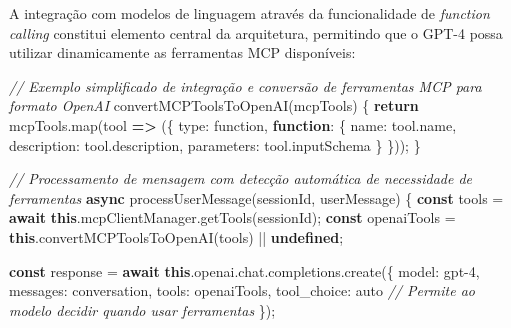 \documentclass[
]{article}
\newenvironment{Shaded}{}{}
\newcommand{\AttributeTok}[1]{\textcolor[rgb]{0.49,0.56,0.16}{#1}}
\newcommand{\CommentTok}[1]{\textcolor[rgb]{0.38,0.63,0.69}{\textit{#1}}}
\newcommand{\ControlFlowTok}[1]{\textcolor[rgb]{0.00,0.44,0.13}{\textbf{#1}}}
\newcommand{\DataTypeTok}[1]{\textcolor[rgb]{0.56,0.13,0.00}{#1}}
\newcommand{\FunctionTok}[1]{\textcolor[rgb]{0.02,0.16,0.49}{#1}}
\newcommand{\KeywordTok}[1]{\textcolor[rgb]{0.00,0.44,0.13}{\textbf{#1}}}
\newcommand{\NormalTok}[1]{#1}
\newcommand{\OperatorTok}[1]{\textcolor[rgb]{0.40,0.40,0.40}{#1}}
\newcommand{\StringTok}[1]{\textcolor[rgb]{0.25,0.44,0.63}{#1}}
\begin{document}
A integração com modelos de linguagem através da funcionalidade de
\emph{function calling} constitui elemento central da arquitetura,
permitindo que o GPT-4 possa utilizar dinamicamente as ferramentas MCP
disponíveis:

\begin{Shaded}
\begin{Highlighting}[]
\CommentTok{// Exemplo simplificado de integração e conversão de ferramentas MCP para formato OpenAI}
\FunctionTok{convertMCPToolsToOpenAI}\NormalTok{(mcpTools) \{}
  \ControlFlowTok{return}\NormalTok{ mcpTools}\OperatorTok{.}\FunctionTok{map}\NormalTok{(tool }\KeywordTok{=\textgreater{}}\NormalTok{ (\{}
    \DataTypeTok{type}\OperatorTok{:} \StringTok{\textquotesingle{}function\textquotesingle{}}\OperatorTok{,}
    \KeywordTok{function}\OperatorTok{:}\NormalTok{ \{}
      \DataTypeTok{name}\OperatorTok{:}\NormalTok{ tool}\OperatorTok{.}\AttributeTok{name}\OperatorTok{,}
      \DataTypeTok{description}\OperatorTok{:}\NormalTok{ tool}\OperatorTok{.}\AttributeTok{description}\OperatorTok{,}
      \DataTypeTok{parameters}\OperatorTok{:}\NormalTok{ tool}\OperatorTok{.}\AttributeTok{inputSchema}
\NormalTok{    \}}
\NormalTok{  \}))}\OperatorTok{;}
\NormalTok{\}}

\CommentTok{// Processamento de mensagem com detecção automática de necessidade de ferramentas}
\KeywordTok{async} \FunctionTok{processUserMessage}\NormalTok{(sessionId}\OperatorTok{,}\NormalTok{ userMessage) \{}
  \KeywordTok{const}\NormalTok{ tools }\OperatorTok{=} \ControlFlowTok{await} \KeywordTok{this}\OperatorTok{.}\AttributeTok{mcpClientManager}\OperatorTok{.}\FunctionTok{getTools}\NormalTok{(sessionId)}\OperatorTok{;}
  \KeywordTok{const}\NormalTok{ openaiTools }\OperatorTok{=} \KeywordTok{this}\OperatorTok{.}\FunctionTok{convertMCPToolsToOpenAI}\NormalTok{(tools) }\OperatorTok{||} \KeywordTok{undefined}\OperatorTok{;}
  
  \KeywordTok{const}\NormalTok{ response }\OperatorTok{=} \ControlFlowTok{await} \KeywordTok{this}\OperatorTok{.}\AttributeTok{openai}\OperatorTok{.}\AttributeTok{chat}\OperatorTok{.}\AttributeTok{completions}\OperatorTok{.}\FunctionTok{create}\NormalTok{(\{}
    \DataTypeTok{model}\OperatorTok{:} \StringTok{\textquotesingle{}gpt{-}4\textquotesingle{}}\OperatorTok{,}
    \DataTypeTok{messages}\OperatorTok{:}\NormalTok{ conversation}\OperatorTok{,}
    \DataTypeTok{tools}\OperatorTok{:}\NormalTok{ openaiTools}\OperatorTok{,}
    \DataTypeTok{tool\_choice}\OperatorTok{:} \StringTok{\textquotesingle{}auto\textquotesingle{}}  \CommentTok{// Permite ao modelo decidir quando usar ferramentas}
\NormalTok{  \})}\OperatorTok{;}
  

\end{Highlighting}
\end{Shaded}
\end{document}
